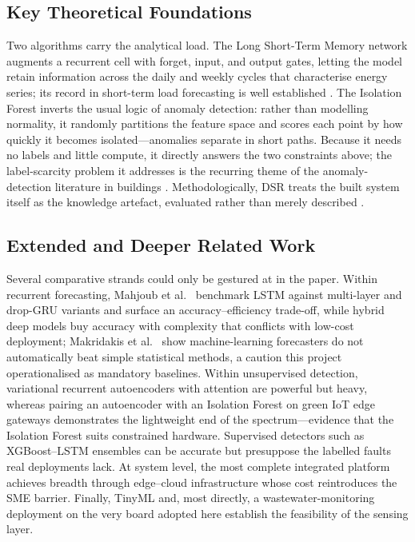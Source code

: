 \documentclass[11pt,a4paper]{article}
\begin{document}
\subsection{Key Theoretical Foundations}
Two algorithms carry the analytical load. The Long Short-Term Memory network
\cite{hochreiter1997long} augments a recurrent cell with forget, input, and
output gates, letting the model retain information across the daily and weekly
cycles that characterise energy series; its record in short-term load
forecasting is well established \cite{kong2017short}. The Isolation Forest
\cite{liu2008isolation} inverts the usual logic of anomaly detection: rather
than modelling normality, it randomly partitions the feature space and scores
each point by how quickly it becomes isolated---anomalies separate in short
paths. Because it needs no labels and little compute, it directly answers the
two constraints above; the label-scarcity problem it addresses is the recurring
theme of the anomaly-detection literature in buildings
\cite{himeur2021artificial}. Methodologically, DSR treats the built system
itself as the knowledge artefact, evaluated rather than merely described
\cite{hevner2004design,peffers2007design}.

\subsection{Extended and Deeper Related Work}
Several comparative strands could only be gestured at in the paper. Within
recurrent forecasting, Mahjoub et al.\ \cite{mahjoub2022predicting} benchmark
LSTM against multi-layer and drop-GRU variants and surface an
accuracy--efficiency trade-off, while hybrid deep models \cite{wen2024deep} buy
accuracy with complexity that conflicts with low-cost deployment; Makridakis et
al.\ \cite{makridakis2018statistical} show machine-learning forecasters do not
automatically beat simple statistical methods, a caution this project
operationalised as mandatory baselines. Within unsupervised detection,
variational recurrent autoencoders with attention \cite{pereira2018unsupervised}
are powerful but heavy, whereas pairing an autoencoder with an Isolation Forest
on green IoT edge gateways \cite{jamshidi2025lightweight} demonstrates the
lightweight end of the spectrum---evidence that the Isolation Forest suits
constrained hardware. Supervised detectors such as XGBoost--LSTM ensembles
\cite{chen2024effective} can be accurate but presuppose the labelled faults real
deployments lack. At system level, the most complete integrated platform
\cite{bin2022real} achieves breadth through edge--cloud infrastructure whose
cost reintroduces the SME barrier. Finally, TinyML \cite{warden2019tinyml} and,
most directly, a wastewater-monitoring deployment on the very board adopted here
\cite{baskar2024edge} establish the feasibility of the sensing layer.
\end{document}
